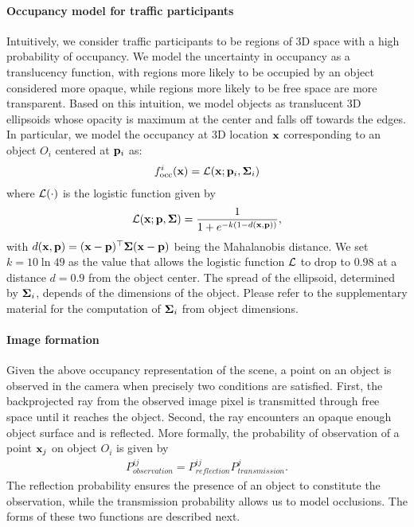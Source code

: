 \paragraph{Occupancy model for traffic participants}
Intuitively, we consider traffic participants to be regions of 3D space with a high probability of occupancy. We model the uncertainty in occupancy as a translucency function, with regions more likely to be occupied by an object considered more opaque, while regions more likely to be free space are more transparent. Based on this intuition, we model objects as translucent 3D ellipsoids whose opacity is maximum at the center and falls off towards the edges. In particular, we model the occupancy at 3D location $\mathbf{x}$ corresponding to an object $O_i$ centered at $\mathbf{p}_i$ as:
\begin{align}
  f^i_{\text{occ}}(\mathbf{x}) = \mathcal{L}(\mathbf{x}; \mathbf{p}_i, \bm{\Sigma}_i)
\end{align}
where $\mathcal{L}(\cdot)$ is the logistic function given by
\begin{align}
  \mathcal{L}(\mathbf{x}; \mathbf{p}, \bm{\Sigma}) = \frac{1}{1 + e^{-k(1 - d(\mathbf{x},\mathbf{p}))}},
\end{align}
with $d(\mathbf{x}, \mathbf{p}) = (\mathbf{x}-\mathbf{p})^\top\bm{\Sigma}(\mathbf{x}-\mathbf{p})$ being the Mahalanobis distance. We set $k = 10\ln{49}$ as the value that allows the logistic function $\mathcal{L}$ to drop to $0.98$ at a distance $d = 0.9$ from the object center. The spread of the ellipsoid, determined by $\bm{\Sigma}_i$, depends of the dimensions of the object. Please refer to the supplementary material for the computation of $\bm{\Sigma}_i$ from object dimensions.


\paragraph{Image formation}
Given the above occupancy representation of the scene, a point on an object is observed in the camera when precisely two conditions are satisfied. First, the backprojected ray from the observed image pixel is transmitted through free space until it reaches the object. Second, the ray encounters an opaque enough object surface and is reflected. More formally, the probability of observation of a point $\mathbf{x}_j$ on object $O_i$ is given by
\begin{align}
P^{ij}_{\textit{observation}} = P^{ij}_{\textit{reflection}}P^{j}_{\textit{transmission}}.
\label{eq:imgform}
\end{align}
The reflection probability ensures the presence of an object to constitute the observation, while the transmission probability allows us to model occlusions. The forms of these two functions are described next.


